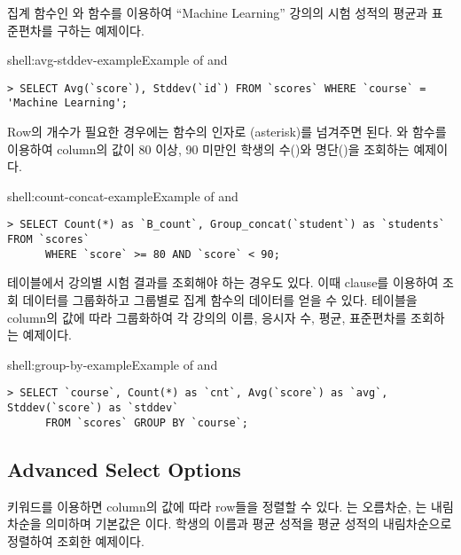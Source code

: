 \은 집계 함수인 와  함수를 이용하여 ``Machine Learning'' 강의의 시험 성적의 평균과 표준편차를 구하는 예제이다.

\begin{shellenv}{shell:avg-stddev-example}{Example of  and }\begin{verbatim}
> SELECT Avg(`score`), Stddev(`id`) FROM `scores` WHERE `course` = 'Machine Learning';
\end{verbatim}
\end{shellenv}

Row의 개수가 필요한 경우에는  함수의 인자로 \cd{*}(asterisk)를 넘겨주면 된다. \은 와  함수를 이용하여  column의 값이 80 이상, 90 미만인 학생의 수()와 명단()을 조회하는 예제이다.

\begin{shellenv}{shell:count-concat-example}{Example of  and }
\begin{verbatim}
> SELECT Count(*) as `B_count`, Group_concat(`student`) as `students` FROM `scores`
      WHERE `score` >= 80 AND `score` < 90;
\end{verbatim}
\end{shellenv}

 테이블에서 강의별 시험 결과를 조회해야 하는 경우도 있다. 이때  clause를 이용하여 조회 데이터를 그룹화하고 그룹별로 집계 함수의 데이터를 얻을 수 있다. \은  테이블을  column의 값에 따라 그룹화하여 각 강의의 이름, 응시자 수, 평균, 표준편차를 조회하는 예제이다.

\begin{shellenv}{shell:group-by-example}{Example of  and }
\begin{verbatim}
> SELECT `course`, Count(*) as `cnt`, Avg(`score`) as `avg`, Stddev(`score`) as `stddev`
      FROM `scores` GROUP BY `course`;
\end{verbatim}
\end{shellenv}

\subsection*{Advanced Select Options}

 키워드를 이용하면 column의 값에 따라 row들을 정렬할 수 있다. 는 오름차순, 는 내림차순을 의미하며 기본값은 이다. \은 학생의 이름과 평균 성적을 평균 성적의 내림차순으로 정렬하여 조회한 예제이다.

